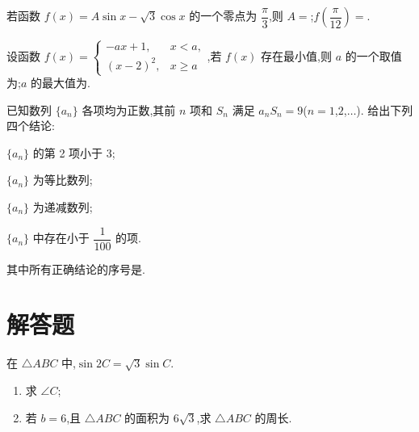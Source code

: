 \begin{problem}
若函数 \(f(x)=A\sin x-\sqrt3\cos x\) 的一个零点为 \(\dfrac{\pi}{3}\),则 \(A=\)\fillinblank{};\(f\left(\dfrac{\pi}{12}\right)=\)\fillinblank{}.
\end{problem}

\begin{problem}
设函数 \(f(x)=\begin{cases}
-ax+1,&x<a,\\
\left(x-2\right)^2,&x\ge a
\end{cases}\),若 \(f(x)\) 存在最小值,则 \(a\) 的一个取值为\fillinblank{};\(a\) 的最大值为\fillinblank{}.
\end{problem}

\begin{problem}
已知数列 \(\{a_n\}\) 各项均为正数,其前 \(n\) 项和 \(S_n\) 满足 \(a_nS_n=9\)(\(n=1\),\(2\),\(\dots\)). 给出下列四个结论:

\begin{circlelist}
\item \(\{a_n\}\) 的第 2 项小于 3;

\item \(\{a_n\}\) 为等比数列;

\item \(\{a_n\}\) 为递减数列;

\item \(\{a_n\}\) 中存在小于 \(\dfrac{1}{100}\) 的项.
\end{circlelist}

其中所有正确结论的序号是\fillinblank{}.
\end{problem}

\section{解答题}

\begin{problem}
在 \(\triangle ABC\) 中,\(\sin 2C=\sqrt3\sin C\).

\begin{enumerate}
\item 求 \(\angle C\);

\item 若 \(b=6\),且 \(\triangle ABC\) 的面积为 \(6\sqrt3\),求 \(\triangle ABC\) 的周长.
\end{enumerate}
\end{problem}

